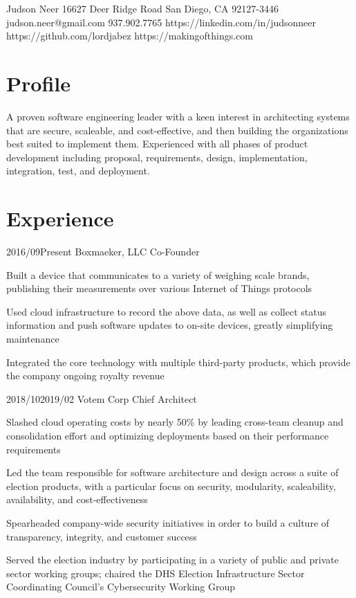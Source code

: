 \documentclass{article}
\begin{document}
\header
  {Judson Neer}
  {16627 Deer Ridge Road}
  {San Diego, CA 92127-3446}
  {judson.neer@gmail.com}
  {937.902.7765}
  {https://linkedin.com/in/judsonneer}
  {https://github.com/lordjabez}
  {https://makingofthings.com}


\section{Profile}

A proven software engineering leader with a keen interest in architecting systems that are secure, scaleable, and cost-effective, and then building the organizations best suited to implement them. Experienced with all phases of product development including proposal, requirements, design, implementation, integration, test, and deployment.


\section{Experience}

\job
  {2016/09}{Present}
  {Boxmaeker, LLC}
  {Co-Founder}
  {\begin{achievements}
    \item Built a device that communicates to a variety of weighing scale brands, publishing their measurements over various Internet of Things protocols
    \item Used cloud infrastructure to record the above data, as well as collect status information and push software updates to on-site devices, greatly simplifying maintenance
    \item Integrated the core technology with multiple third-party products, which provide the company ongoing royalty revenue
  \end{achievements}}

\job
  {2018/10}{2019/02}
  {Votem Corp}
  {Chief Architect}
  {\begin{achievements}
    \item Slashed cloud operating costs by nearly 50\% by leading cross-team cleanup and consolidation effort and optimizing deployments based on their performance requirements
    \item Led the team responsible for software architecture and design across a suite of election products, with a particular focus on security, modularity, scaleability, availability, and cost-effectiveness
    \item Spearheaded company-wide security initiatives in order to build a culture of transparency, integrity, and customer success
    \item Served the election industry by participating in a variety of public and private sector working groups; chaired the DHS Election Infrastructure Sector Coordinating Council's Cybersecurity Working Group
  \end{achievements}}
\end{document}
